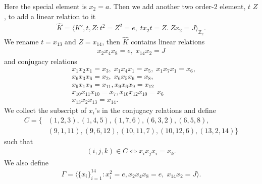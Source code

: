 \documentclass[11pt,letterpaper]{article}
\newcommand{\1}{\mathbb{1}}
\theoremstyle{definition}
\begin{document}
Here the special element is $x_2 = a$.
Then we add another two order-$2$ element, $t$ $Z$, to add a linear relation to it
\begin{align}
	\hat{K} = \langle K', t ,Z: t^2=Z^2 = e,\; tx_2t = Z.\; Zx_2 = J\rangle_{\mathbb{Z}_2}.
\end{align}
We rename $t = x_{13}$ and $Z = x_{14}$, then $\hat{K}$ contains linear relations
\begin{align*}
	x_2x_4x_8 = e,\; x_{14}x_{2} = J
\end{align*}
and conjugacy relations
\begin{align*}
	&x_1x_2x_1 =x_3, \;x_1x_4x_1 =x_5,\; x_1x_7x_1 =x_6,\\
	&x_6x_3x_6 =x_2, \;x_6x_5x_6 =x_8,\\
	&x_9x_1x_9 = x_{11},x_9x_6x_9 = x_{12}\\
	&x_{10}x_{11}x_{10} = x_7,x_{10}x_{12}x_{10} = x_6\\
	&x_{13}x_2x_{13} = x_{14}.
\end{align*}
We collect the subscript of $x_i$'s in the conjugacy relations and define
\begin{align}
	C= \{ &(1,2,3), (1,4,5), (1,7,6), (6,3,2), (6,5,8),\\
	&(9,1,11),(9,6,12),(10,11,7),(10,12,6),(13,2,14)\}
\end{align}
such that
\begin{align*}
	(i,j,k) \in C \Longleftrightarrow x_ix_jx_i = x_k.
\end{align*}
We also define 
\begin{align}
	\Gamma = \langle \{x_i\}_{i=1}^{14} : x_i^2 = e, x_2x_4x_8 = e,\; x_{14}x_{2} = J \rangle.
\end{align}
\end{document}
